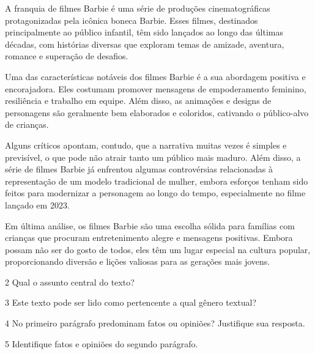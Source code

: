 \begin{myquote}

A franquia de filmes Barbie é uma série de produções cinematográficas
protagonizadas pela icônica boneca Barbie. Esses filmes, destinados
principalmente ao público infantil, têm sido lançados ao longo das últimas
décadas, com histórias diversas que exploram temas de amizade, aventura,
romance e superação de desafios.

Uma das características notáveis dos filmes Barbie é a sua abordagem
positiva e encorajadora. Eles costumam promover mensagens de empoderamento
feminino, resiliência e trabalho em equipe. Além disso, as animações e designs
de personagens são geralmente bem elaborados e coloridos, cativando o
público-alvo de crianças.

Alguns críticos apontam, contudo, que a narrativa muitas vezes é simples e
previsível, o que pode não atrair tanto um público mais maduro. Além disso, a
série de filmes Barbie já enfrentou algumas controvérsias relacionadas à
representação de um modelo tradicional de mulher, embora esforços tenham sido feitos
para modernizar a personagem ao longo do tempo, especialmente no filme 
lançado em 2023.

Em última análise, os filmes Barbie são uma escolha sólida para famílias com
crianças que procuram entretenimento alegre e mensagens positivas. Embora
possam não ser do gosto de todos, eles têm um lugar especial na cultura
popular, proporcionando diversão e lições valiosas para as gerações mais
jovens.


\end{myquote}

\num{2} Qual o assunto central do texto?


\num{3} Este texto pode ser lido como pertencente a qual gênero textual?


\num{4} No primeiro parágrafo predominam fatos ou opiniões? Justifique sua resposta.


\num{5} Identifique fatos e opiniões do segundo parágrafo.

